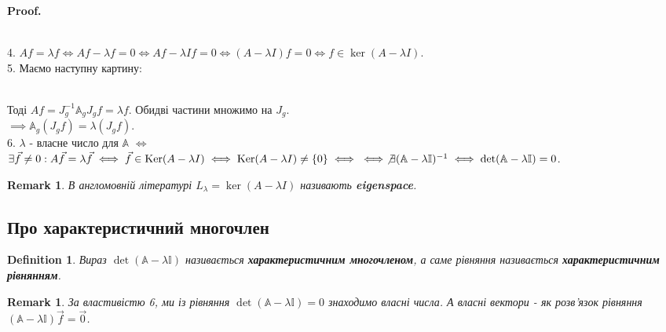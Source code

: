 \documentclass[a4paper, 10pt]{article}
\makeatletter
\theoremstyle{theoremdd}
\newtheorem{definition}[theorem]{Definition}
\newtheorem{remark}[theorem]{Remark}
\renewenvironment{proof}[1][Proof.\\]{\par
\pushQED{\hfill \qed}%
\normalfont \topsep6\p@\@plus6\p@\relax
\trivlist
\item\relax
{\bfseries
#1\@addpunct{.}}\hspace\labelsep\ignorespaces
}{%
\popQED\endtrivlist\@endpefalse
}
\makeatother
\begin{document}
\begin{proof}
\bigskip \\
4. $Af = \lambda f \iff Af - \lambda f = 0 \iff Af - \lambda If = 0 \iff (A-\lambda I)f = 0 \iff f \in \ker(A - \lambda I)$.
\bigskip \\
5. Маємо наступну картину:\\
\\
Тоді $Af = J_g^{-1} \mathbb{A}_g J_g f = \lambda f$. Обидві частини множимо на $J_g$.\\
$\implies \mathbb{A}_g (J_g f) = \lambda (J_g f)$.
\bigskip \\
6. $\lambda$ - власне число для $\mathbb{A}$ $\iff$ $\exists \vec{f} \neq 0: A \vec{f} = \lambda \vec{f} \iff \vec{f} \in \ker (A-\lambda I) \iff \ker (A-\lambda I) \neq \{0\} \iff \\ \iff \not\exists (\mathbb{A} - \lambda \mathbb{I})^{-1} \iff \det (\mathbb{A} - \lambda \mathbb{I}) = 0$.
\end{proof}

\begin{remark}
В англомовній літературі $L_{\lambda} = \ker (A - \lambda I)$ називають \textbf{eigenspace}.
\end{remark}

\subsection{Про характеристичний многочлен}
\begin{definition}
Вираз $\det(\mathbb{A} - \lambda \mathbb{I})$ називається \textbf{характеристичним многочленом}, а саме рівняння називається \textbf{характеристичним рівнянням}.
\end{definition}

\begin{remark}
За властивістю 6, ми із рівняння $\det (\mathbb{A} - \lambda \mathbb{I}) = 0$ знаходимо власні числа. А власні вектори - як розв'язок рівняння $(\mathbb{A} - \lambda \mathbb{I})\vec{f} = \vec{0}$.
\end{remark}
\end{document}

